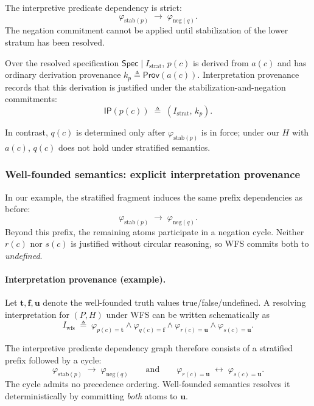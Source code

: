 \documentclass[acmsmall,nonacm]{acmart}
\theoremstyle{remark}
\numberwithin{definition}{section}
\numberwithin{theorem}{section}
\numberwithin{lemma}{section}
\numberwithin{corollary}{section}
\numberwithin{remark}{section}
\numberwithin{example}{section}
\numberwithin{observation}{section}
\numberwithin{assumption}{section}
\newcommand{\Spec}{\mathsf{Spec}}
\newcommand{\Prov}{\mathsf{Prov}}
\begin{document}
The interpretive predicate dependency is strict:
\[
  \varphi_{\mathrm{stab}(p)} \;\rightarrow\; \varphi_{\mathrm{neg}(q)}.
\]
The negation commitment cannot be applied until stabilization of the lower stratum
has been resolved.

Over the resolved specification $\Spec \mid I_{\mathrm{strat}}$, $p(c)$ is derived
from $a(c)$ and has ordinary derivation provenance
$k_p \triangleq \Prov(a(c))$.
Interpretation provenance records that this derivation is justified under the
stabilization-and-negation commitments:
\[
  \mathsf{IP}(p(c)) \;\triangleq\; (I_{\mathrm{strat}},\, k_p) .
\]

In contrast, $q(c)$ is determined only after $\varphi_{\mathrm{stab}(p)}$ is in
force; under our $H$ with $a(c)$, $q(c)$ does not hold under stratified semantics.

\subsubsection{Well-founded semantics: explicit interpretation provenance}

In our example, the stratified fragment induces the same prefix dependencies as
before:
\[
  \varphi_{\mathrm{stab}(p)} \;\rightarrow\; \varphi_{\mathrm{neg}(q)}.
\]
Beyond this prefix, the remaining atoms participate in a negation cycle.
Neither $r(c)$ nor $s(c)$ is justified without circular reasoning, so WFS commits both
to \emph{undefined}.

\paragraph{Interpretation provenance (example).}
Let $\mathbf{t},\mathbf{f},\mathbf{u}$ denote the well-founded truth values
true/false/undefined.
A resolving interpretation for $(P,H)$ under WFS can be written schematically as
\[
  I_{\mathrm{wfs}} \;\triangleq\;
  \varphi_{p(c)=\mathbf{t}} \wedge \varphi_{q(c)=\mathbf{f}}
  \wedge \varphi_{r(c)=\mathbf{u}} \wedge \varphi_{s(c)=\mathbf{u}} .
\]

The interpretive predicate dependency graph therefore consists of a stratified
prefix followed by a cycle:
\[
  \varphi_{\mathrm{stab}(p)} \;\rightarrow\; \varphi_{\mathrm{neg}(q)}
  \qquad\text{and}\qquad
  \varphi_{r(c)=\mathbf{u}} \;\leftrightarrow\; \varphi_{s(c)=\mathbf{u}} .
\]
The cycle admits no precedence ordering.
Well-founded semantics resolves it deterministically by committing \emph{both}
atoms to $\mathbf{u}$.
\end{document}
